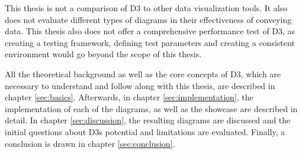 This thesis is not a comparison of D3 to other data visualization tools. It also does not evaluate different types of diagrams in their effectiveness of conveying data. This thesis also does not offer a comprehensive performance test of D3, as creating a testing framework, defining test parameters and creating a consistent environment would go beyond the scope of this thesis.

All the theoretical background as well as the core concepts of D3, which are necessary to understand and follow along with this thesis, are described in chapter \ref{sec:basics}. Afterwards, in chapter \ref{sec:implementation}, the implementation of each of the diagrams, as well as the showcase are described in detail. In chapter \ref{sec:discussion}, the resulting diagrams are discussed and the initial questions about D3s potential and limitations are evaluated. Finally, a conclusion is drawn in chapter \ref{sec:conclusion}.
